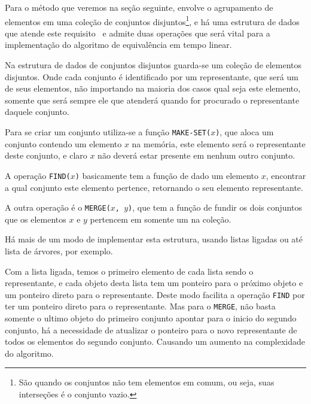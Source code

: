 \documentclass[
	12pt,				%
	openany,
	oneside,
	a4paper,			%
	english,			%
	brazil				%
	]{abntex2}
\begin{document}
  Para o método que veremos na seção seguinte, envolve o agrupamento de elementos em uma coleção de conjuntos disjuntos\footnote{São quando os conjuntos não tem elementos em comum, ou seja, suas interseções é o conjunto vazio.}, e há uma estrutura de dados que atende este requisito~\cite{cormen} e admite duas operações que será vital para a implementação do algoritmo de equivalência em tempo linear. %


  Na estrutura de dados de conjuntos disjuntos guarda-se um coleção de elementos disjuntos. Onde cada conjunto é identificado por um representante, que será um de seus elementos, não importando na maioria dos casos qual seja este elemento, somente que será sempre ele que atenderá quando for procurado o representante daquele conjunto.

  Para se criar um conjunto utiliza-se a função \texttt{MAKE-SET($x$)}, que aloca um conjunto contendo um elemento $x$ na memória, este elemento será o representante deste conjunto, e claro $x$ não deverá estar presente em nenhum outro conjunto.

  A operação \texttt{FIND($x$)} basicamente tem a função de dado um elemento $x$, encontrar a qual conjunto este elemento pertence, retornando o seu elemento representante.

  A outra operação é o \texttt{MERGE($x$, $y$)}, que tem a função de fundir os dois conjuntos que os elementos $x$ e $y$ pertencem em somente um na coleção.

  Há mais de um modo de implementar esta estrutura, usando listas ligadas ou até lista de árvores, por exemplo.

  Com a lista ligada, temos o primeiro elemento de cada lista sendo o representante, e cada objeto desta lista tem um ponteiro para o próximo objeto e um ponteiro direto para o representante. Deste modo facilita a operação \texttt{FIND} por ter um ponteiro direto para o representante. Mas para o \texttt{MERGE}, não basta somente o ultimo objeto do primeiro conjunto apontar para o inicio do segundo conjunto, há a necessidade de atualizar o ponteiro para o novo representante de todos os elementos do segundo conjunto. Causando um aumento na complexidade do algoritmo.
\end{document}
